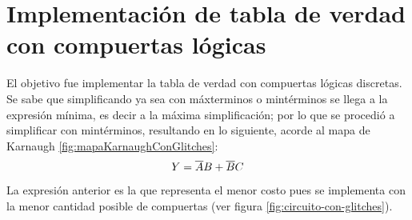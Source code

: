 \section{Implementación de tabla de verdad con compuertas lógicas}

\vspace{2mm}
\begin{table}
    \begin{center}
        \begin{Karnaughvuit}
        \end{Karnaughvuit}
        \caption{Mapa de Karnaugh de menor costo.}
        \label{fig:mapaKarnaughConGlitches}
    \end{center}
\end{table} 
\par
El objetivo fue implementar la tabla de verdad con compuertas lógicas discretas. 
Se sabe que simplificando ya sea con máxterminos o mintérminos se llega a la expresión mínima, es decir a la máxima simplificación; 
por lo que se procedió a simplificar con mintérminos, resultando en lo siguiente, acorde al mapa de Karnaugh \ref{fig:mapaKarnaughConGlitches}:
\vspace{4mm}
\begin{equation}
    Y=\overline{A}B+\overline{B}C
    \vspace{5mm}
\end{equation}
La expresión anterior es la que representa el menor costo pues se implementa con la menor cantidad posible de compuertas (ver figura \ref{fig:circuito-con-glitches}).
